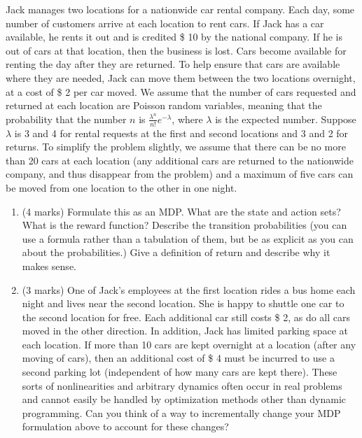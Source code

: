 \documentclass[addpoints,12pt,solution]{exam}
\begin{document}
\begin{questions}
\begin{enumerate}[label=(\alph*)]
\begin{solution}
\end{solution}

\end{enumerate}



 Jack manages two locations for a nationwide car rental company. Each day, some number of customers arrive at each location to rent cars. If Jack has a car available, he rents it out and is credited \$ 10 by the national company. If he is out of cars at that location, then the business is lost. Cars become available for renting the day after they are returned. To help ensure that cars are available where they are needed, Jack can move them between the two locations overnight, at a cost of \$ 2 per car moved. We assume that the number of cars requested and returned at each location are Poisson random variables, meaning that the probability that the number $n$ is $\frac{\lambda^n}{n!}e^{-\lambda}$, where $\lambda$ is the expected number. Suppose $\lambda$ is 3 and 4 for rental requests at the first and second locations and 3 and 2 for returns. To simplify the problem slightly, we assume that there can be no more than 20 cars at each location (any additional cars are returned to the nationwide company, and thus disappear from the problem) and a
maximum of five cars can be moved from one location to the other in one night.

\begin{enumerate}[label=(\alph*)]

\item (4 marks) Formulate this as an MDP. What are the state and action sets? What is the reward function? Describe the transition probabilities (you can use a formula rather than a tabulation of them, but be as explicit as you can about the probabilities.) Give a definition of return and describe why it makes sense.

\begin{solution}

\end{solution}

\item (3 marks) One of Jack’s employees at the first location rides a bus home each night and lives near the second location. She is happy to shuttle one car to the second location for free. Each additional car still costs \$ 2, as do all cars moved in the other direction. In addition, Jack has limited parking space at each location. If more than 10 cars are kept overnight at a location (after any moving of cars), then an additional cost of \$ 4 must be incurred to use a second parking lot (independent of how many cars are kept there). These sorts of nonlinearities and arbitrary dynamics often occur in real problems and cannot easily be handled by optimization methods other than
dynamic programming. Can you think of a way to incrementally change your MDP formulation above to account for these changes?


\end{enumerate}
\end{questions}
\end{document}
